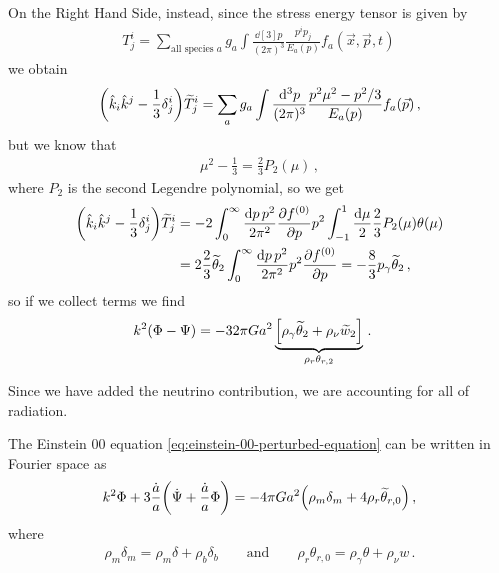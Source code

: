\documentclass[main.tex]{subfiles}
\begin{document}

On the Right Hand Side, instead, since the stress energy tensor is given by 
%
\begin{align}
T^{i}_{j} = \sum _{\text{all species \(a\)}} g_{a}
\int  \frac{ \dd[3]{p}}{(2 \pi )^3} 
\frac{p^{i}p_{j}}{E_{a}(p)} f_a (\vec{x}, \vec{p}, t)
\,
\end{align}
%
we obtain 
%
\begin{align}
\qty(\hat{k}_{i} \hat{k}^{j} - \frac{1}{3} \delta^{i}_{j})
\widetilde{T}^{i}_{j} 
= \sum _{a} g_{a} \int  \frac{\dd[3]{p}}{(2\pi )^3} \frac{p^2\mu^2 - p^2/3}{E_a (p)} f_a (\vec{p})
\,,
\end{align}
%
but we know that 
%
\begin{align}
\mu^2 - \frac{1}{3} = \frac{2}{3} P_2 (\mu )
\,,
\end{align}
%
where \(P_2\) is the second Legendre polynomial, so we get 
%
\begin{align}
\qty(\hat{k}_{i} \hat{k}^{j} - \frac{1}{3} \delta^{i}_{j})
\widetilde{T}^{i}_{j} &=
-2 \int_{0}^{ \infty } \frac{ \dd{p} p^2}{2\pi^2} \pdv{f^{(0)}}{p}p^2
\int_{-1}^{1} \frac{ \dd{\mu }}{2} \frac{2}{3} P_2 (\mu ) \theta (\mu )  \\
&= 2 \frac{2}{3} \widetilde{\theta}_{2} \int_{0}^{ \infty } \frac{ \dd{p}p^2}{2 \pi^2} p^2 \pdv{f^{(0)}}{p} = - \frac{8}{3} p_{\gamma } \widetilde{\theta}_{2}
\,,
\end{align}
%
so if we collect terms we find 
%
\begin{align} \label{eq:radiation-temperature-perturbation-term}
k^2 \qty(\Phi - \Psi ) &= - 32 \pi G a^2 
\underbrace{\qty[\rho_{\gamma } \widetilde{\theta}_{2} + \rho_{\nu } \widetilde{w}_{2}] }_{\rho_{r} \theta_{r, 2}} 
\,.
\end{align}

Since we have added the neutrino contribution, we are accounting for all of radiation. 

The Einstein 00 equation \eqref{eq:einstein-00-perturbed-equation} can be written in Fourier space as 
%
\begin{align}
k^2 \Phi + 3 \frac{\dot{a}}{a} \qty(\dot{\Psi} + \frac{\dot{a}}{a} \Phi )
= -4 \pi G a^2 \qty(\rho_{m } \delta_{m} + 4 \rho_{r} \widetilde{\theta}_{r, 0}) 
\,,
\end{align}
%
where 
%
\begin{align}
\rho_{m} \delta_{m} = \rho_{m} \delta + \rho_{b} \delta_{b} 
\qquad \text{and} \qquad
\rho_{r} \theta_{r, 0} = \rho_{\gamma } \theta + \rho_{\nu } w
\,.
\end{align}
\end{document}
